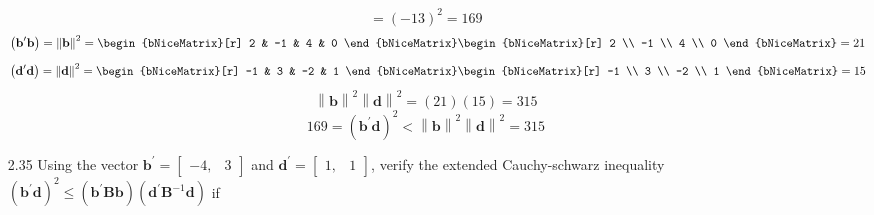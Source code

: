 \begin{enumerate}[font=\bfseries]
\[            =
            {\left(-13\right)}^2
            = 169
        \]
        \[
            {\left(\textbf{b}^\prime\textbf{b}\right)}
            = 
            {\left\|\textbf{b}\right\|}^2
            =
            \begin{bNiceMatrix}[r]
                2 & -1 & 4 & 0
            \end{bNiceMatrix}
            \begin{bNiceMatrix}[r]
                2 \\
                -1 \\
                4 \\
                0
            \end{bNiceMatrix}
            =
            21
        \]
        \[
            {\left(\textbf{d}^\prime\textbf{d}\right)}
            = 
            {\left\|\textbf{d}\right\|}^2
            =
            \begin{bNiceMatrix}[r]
                -1 & 3 & -2 & 1
            \end{bNiceMatrix}
            \begin{bNiceMatrix}[r]
                -1 \\
                3 \\
                -2 \\
                1
            \end{bNiceMatrix}
            =
            15
        \]
        \[
            {\left\|\textbf{b}\right\|}^2{\left\|\textbf{d}\right\|}^2
            =
            (21)(15) = 315
        \]
        \[
            169 = {\left(\textbf{b}^\prime\textbf{d}\right)}^2
            <
            {\left\|\textbf{b}\right\|}^2 {\left\|\textbf{d}\right\|}^2
            =
            315
        \]
        \item[2.35] Using the vector $\mathbf{b}^\prime = \begin{bmatrix}
            -4, & 3
        \end{bmatrix}$ and $\mathbf{d}^\prime = \begin{bmatrix}
            1, & 1
        \end{bmatrix}$, verify the extended Cauchy-schwarz inequality ${\left(\mathbf{b}^\prime\mathbf{d}\right)}^{2} \leq {\left(\mathbf{b}^\prime\mathbf{B}\mathbf{b}\right)}{\left(\mathbf{d}^\prime\mathbf{B}^{-1}\mathbf{d}\right)}$ if
        \[
\]
\end{enumerate}
